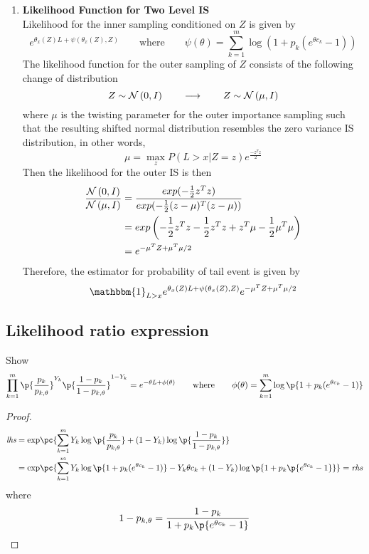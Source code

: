 \documentclass[11pt]{article}
\begin{document}
\newpage 

\begin{enumerate}
    \item \textbf{Likelihood Function for Two Level IS} \\
    Likelihood for the inner sampling conditioned on $Z$ is given by 
    \[
        e^{\theta_x(Z)L + \psi(\theta_x(Z), Z)}
        \qquad \text{where} \qquad 
        \psi(\theta) = \sum_{k=1}^m \log (1 + p_k (e^{\theta c_k} - 1))
    \]
    The likelihood function for the outer sampling of $Z$ consists of the following change of distribution
    \[
        Z \sim \mathcal{N}\left(0, I\right)    
        \qquad \longrightarrow \qquad 
        Z \sim \mathcal{N}\left(\mu, I\right)
    \]
    where $\mu$ is the twisting parameter for the outer importance sampling such that the resulting shifted normal distribution resembles the zero variance IS distribution, in other words,
    \[
        \mu = \max_z P(L>x | Z=z) e^{\frac{-z^T z}{2}}
    \]
    Then the likelihood for the outer IS is then 
    \begin{align*}
        \frac{\mathcal{N}\left(0, I\right)}{\mathcal{N}\left(\mu, I\right)}
        &= \frac{exp(-\frac{1}{2} z^T z)}{exp(-\frac{1}{2} (z-\mu)^T (z-\mu))} \\ 
        &= exp
        \left(
            -\frac{1}{2} z^T z - \frac{1}{2} z^T z + z^T \mu - \frac{1}{2} \mu^T \mu
        \right) \\
        &= e^{ -\mu^T Z + \mu^T \mu /2 } 
    \end{align*}
    Therefore, the estimator for probability of tail event is given by 
    \[
        \mathbbm{1}_{L>x} e^{\theta_x(Z)L + \psi(\theta_x(Z), Z)} e^{ -\mu^T Z + \mu^T \mu /2 }
    \]
\end{enumerate}

\newpage

\subsection*{Likelihood ratio expression}

Show
\[
    \prod_{k=1}^m \p{\frac{p_k}{p_{k, \theta}}}^{Y_k} \p{\frac{1 - p_k}{1 - p_{k, \theta}}}^{1 - Y_k}
    = e^{-\theta L + \phi(\theta)}
    \quad \quad \text{where} \quad \quad
    \phi(\theta) = \sum_{k=1}^m \log \p{1 + p_k (e^{\theta c_k} - 1)}
\]
\begin{proof}
    \begin{align*}
        \textit{lhs}
        &= \text{exp} \pc{
            \sum_{k=1}^m Y_k \log \p{\frac{p_k}{p_{k,\theta}}} + (1 - Y_k) \log \p{\frac{1-p_k}{1-p_{k,\theta}}}
        } \\ 
        &= \text{exp} \pc{
            \sum_{k=1}^m Y_k \log \p{1 + p_k (e^{\theta c_k} - 1)} - Y_k \theta c_k + (1 - Y_k) \log \p{1 + p_k\p{e^{\theta c_k} - 1}}
        } = \textit{rhs} \\
    \end{align*}
    where 
    \[
        1 - p_{k,\theta} = \frac{1-p_k}{1 + p_k\p{e^{\theta c_k}-1}}    
    \]
\end{proof}
\end{document}
